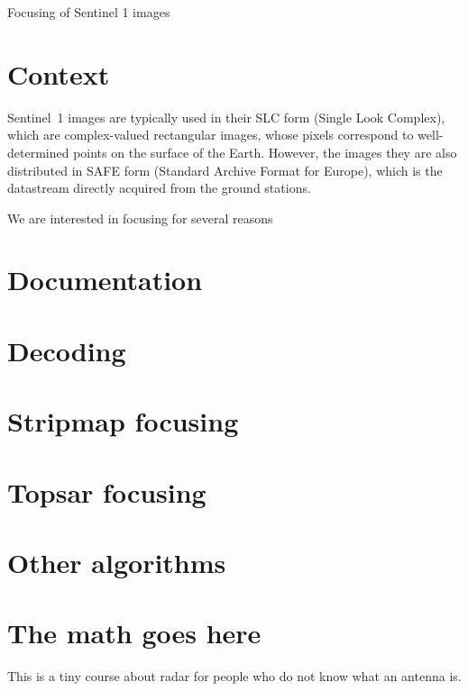 \documentclass[a4paper]{article}      %
\newcommand{\1}{\mathbf{1}}
\begin{document}
{\Large Focusing of Sentinel 1 images}

\vspace{2em}

\section{Context}

Sentinel~1 images are typically used in their SLC form (Single Look Complex),
which are complex-valued rectangular images, whose pixels correspond to
well-determined points on the surface of the Earth.  However, the images they
are also distributed in SAFE form (Standard Archive Format for Europe), which
is the datastream directly acquired from the ground stations.

We are interested in focusing for several reasons

\section{Documentation}



\section{Decoding}

\section{Stripmap focusing}

\section{Topsar focusing}

\section{Other algorithms}

\clearpage
\appendix
\section{The math goes here}

This is a tiny course about radar for people who do not know what an antenna
is.
\end{document}
